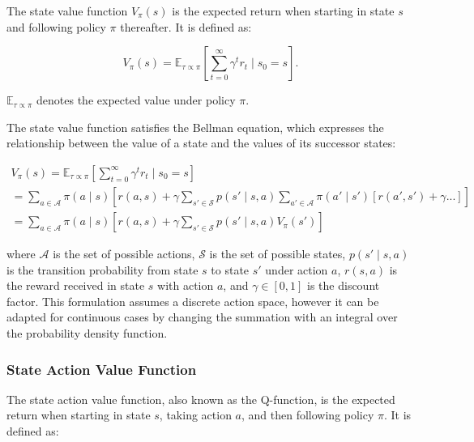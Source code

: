 The state value function $V_{\pi}(s)$ is the expected return when starting in state $s$ and following policy $\pi$ thereafter. It is defined as:

\begin{equation}
    \label{eq:value_func_proper}
    V_{\pi}(s) = \mathbb{E}_{\tau \propto \pi}\left[\sum_{t=0}^{\infty} \gamma^t r_t \mid s_0 = s\right].
\end{equation}

$\mathbb{E}_{\tau \propto \pi}$ denotes the expected value under policy $\pi$.

The state value function satisfies the Bellman equation, which expresses the relationship between the value of a state and the values of its successor states:

\begin{equation}
    \label{bootstrap_v}
    \begin{aligned}
        V_{\pi}(s) = \mathbb{E}_{\tau \propto \pi}\left[\sum_{t=0}^{\infty} \gamma^t r_t \mid s_0 = s\right] \\
        = \sum_{a \in \mathcal{A}} \pi(a \mid s) \left[ r(a,s)  + \gamma \sum_{s' \in \mathcal{S}} p(s' \mid s,a) \sum_{a' \in \mathcal{A}} \pi(a' \mid s') \left[ r(a',s') + \gamma ...\right] \right]\\
        = \sum_{a \in \mathcal{A}} \pi(a \mid s) \left[ r(a,s) +  \gamma \sum_{s' \in \mathcal{S}} p(s' \mid s,a) V_{\pi}(s')\right]
    \end{aligned}
\end{equation}

where $\mathcal{A}$ is the set of possible actions, $\mathcal{S}$ is the set of possible states, $p(s' \mid s,a)$ is the transition probability 
from state $s$ to state $s'$ under action $a$, $r(s,a)$ is the reward received in state $s$ with action $a$, and $\gamma \in [0,1]$ is the discount factor. 
This formulation assumes a discrete action space,
however it can be adapted for continuous cases by changing the summation with an integral over the probability density function.

\subsubsection{State Action Value Function}

The state action value function, also known as the Q-function, is the expected return when starting in state $s$, taking action $a$, and then following 
policy $\pi$. It is defined as:

